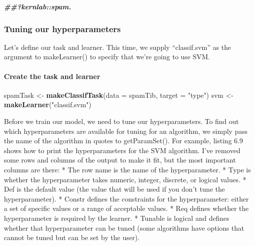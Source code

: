 \documentclass[
]{article}
\newenvironment{Shaded}{\begin{snugshade}}{\end{snugshade}}
\newcommand{\AttributeTok}[1]{\textcolor[rgb]{0.13,0.29,0.53}{#1}}
\newcommand{\DocumentationTok}[1]{\textcolor[rgb]{0.56,0.35,0.01}{\textbf{\textit{#1}}}}
\newcommand{\FunctionTok}[1]{\textcolor[rgb]{0.13,0.29,0.53}{\textbf{#1}}}
\newcommand{\NormalTok}[1]{#1}
\newcommand{\OtherTok}[1]{\textcolor[rgb]{0.56,0.35,0.01}{#1}}
\newcommand{\StringTok}[1]{\textcolor[rgb]{0.31,0.60,0.02}{#1}}
\begin{document}
\begin{Shaded}
\begin{Highlighting}[]
\DocumentationTok{\#\#?kernlab::spam.}
\end{Highlighting}
\end{Shaded}

\subsubsection{Tuning our
hyperparameters}\label{tuning-our-hyperparameters}

Let's define our task and learner. This time, we supply ``classif.svm''
as the argument to makeLearner() to specify that we're going to use SVM.

\paragraph{Create the task and
learner}\label{create-the-task-and-learner}

\begin{Shaded}
\begin{Highlighting}[]
\NormalTok{spamTask }\OtherTok{\textless{}{-}} \FunctionTok{makeClassifTask}\NormalTok{(}\AttributeTok{data =}\NormalTok{ spamTib, }\AttributeTok{target =} \StringTok{"type"}\NormalTok{)}
\NormalTok{svm }\OtherTok{\textless{}{-}} \FunctionTok{makeLearner}\NormalTok{(}\StringTok{"classif.svm"}\NormalTok{)}
\end{Highlighting}
\end{Shaded}

Before we train our model, we need to tune our hyperparameters. To find
out which hyperparameters are available for tuning for an algorithm, we
simply pass the name of the algorithm in quotes to getParamSet(). For
example, listing 6.9 shows how to print the hyperparameters for the SVM
algorithm. I've removed some rows and columns of the output to make it
fit, but the most important columns are there: * The row name is the
name of the hyperparameter. * Type is whether the hyperparameter takes
numeric, integer, discrete, or logical values. * Def is the default
value (the value that will be used if you don't tune the
hyperparameter). * Constr defines the constraints for the
hyperparameter: either a set of specific values or a range of acceptable
values. * Req defines whether the hyperparameter is required by the
learner. * Tunable is logical and defines whether that hyperparameter
can be tuned (some algorithms have options that cannot be tuned but can
be set by the user).
\end{document}
